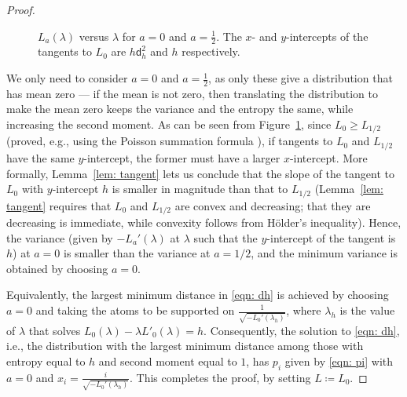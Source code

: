 \documentclass[11pt]{article}
\newcommand{\dist}{\mathsf{d}}
\begin{document}
\begin{proof}
\begin{figure}[!htbp]
			\caption{$L_a(\lambda)$ versus $\lambda$ for $ a = 0$ and $a = \frac12$. The $x$- and $y$-intercepts of the tangents to $L_0$ are $h \dist_h^2$ and $h$ respectively.}
			\label{fig: Lalambda}
		\end{figure}
		
		We only need to consider $a = 0$ and $a = \frac12$, as only these give 
		a distribution that has mean zero \cite{canonne2020discrete} --- if the 
		mean is not zero, then translating the distribution to make the mean 
		zero keeps the variance and the entropy the same, while increasing the 
		second moment.
		As can be seen from Figure~\ref{fig: Lalambda}, since $L_0 \geq 
		L_{1/2}$ (proved, e.g., using the Poisson summation formula 
		\cite{canonne2020discrete}), if tangents to $L_0$ and $L_{1/2}$ have 
		the same $y$-intercept, the former must have a larger $x$-intercept. 
		More formally, Lemma~\ref{lem: tangent} lets us conclude that the slope 
		of the tangent to $L_0$ with $y$-intercept $h$ is smaller in magnitude 
		than that to $L_{1/2}$ (Lemma~\ref{lem: tangent} requires that $L_0$ 
		and $L_{1/2}$ are convex and decreasing; that they are decreasing is 
		immediate, while convexity follows from H\"older's inequality). Hence, 
		the variance (given by $-L_a'(\lambda)$ at $\lambda$ such that the 
		$y$-intercept of the tangent is $h$) at $a = 0$ is smaller than the 
		variance at $a = 1/2$, and the minimum variance is obtained by choosing 
		$a = 0$. 
		
		Equivalently, the largest minimum distance in \eqref{eqn: dh} is 
		achieved by choosing $a = 0$ and taking the atoms to be supported on 
		$\frac{1}{\sqrt{-L_0'(\lambda_h)}}$, where $\lambda_h$ is the value of 
		$\lambda$ that solves $L_0(\lambda) - \lambda L'_0(\lambda) = h$. 
		Consequently, the solution to \eqref{eqn: dh}, i.e., the distribution 
		with the largest minimum distance among those with entropy equal to $h$ 
		and second moment equal to $1$, has $p_i$ given by \eqref{eqn: pi} with 
		$a = 0$ and $x_i = \frac{i}{\sqrt{-L_0'(\lambda_h)}}$. This completes 
		the proof, by setting $L \coloneqq L_0$.
	\end{proof}
	
	
	
\end{document}
